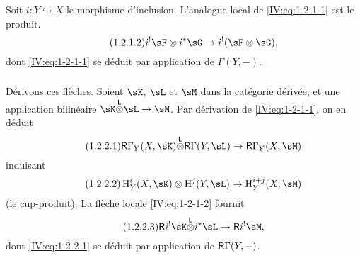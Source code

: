 Soit $i:Y\hookrightarrow X$ le morphisme d'inclusion. L'analogue local de 
\eqref{IV:eq:1-2-1-1} est le produit.
\begin{equation*}\tag{1.2.1.2}\label{IV:eq:1-2-1-2}
  i^!\sF\otimes i^*\sG \to i^!(\sF\otimes\sG) \text{,}
\end{equation*}
dont \eqref{IV:eq:1-2-1-1} se déduit par application de $\Gamma(Y,-)$. 





\subsubsection{}\label{IV:1-2-2}

Dérivons ces flèches. Soient $\sK$, $\sL$ et $\sM$ dans la catégorie 
dérivée, et une application bilinéaire $\sK\lotimes\sL\to\sM$. Par 
dérivation de \eqref{IV:eq:1-2-1-1}, on en déduit 
\begin{equation*}\tag{1.2.2.1}\label{IV:eq:1-2-2-1}
  \R\Gamma_Y(X,\sK) \lotimes \R\Gamma(Y,\sL) \to \R\Gamma_Y(X,\sM) 
\end{equation*}
induisant 
\begin{equation*}\tag{1.2.2.2}\label{IV:eq:1-2-2-2}
  \h_Y^i(X,\sK)\otimes \h^j(Y,\sL) \to \h_Y^{i+j}(X,\sM)
\end{equation*}
(le cup-produit). La flèche locale \eqref{IV:eq:1-2-1-2} fournit 
\begin{equation*}\tag{1.2.2.3}\label{IV:eq:1-2-2-3}
  \R i^! \sK\lotimes i^*\sL \to \R i^!\sM \text{,}
\end{equation*}
dont \eqref{IV:eq:1-2-2-1} se déduit par application de $\mathsf{R}\Gamma(Y,-)$. 





\subsubsection{}\label{IV:1-2-3}

